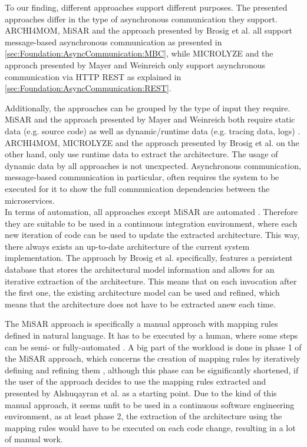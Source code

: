 To our finding, different approaches support different purposes.
The presented approaches differ in the type of asynchronous communication they support.
ARCHI4MOM, MiSAR and the approach presented by Brosig et al. all support message-based asynchronous communication as presented in \autoref{sec:Foundation:AsyncCommunication:MBC}, while MICROLYZE and the approach presented by Mayer and Weinreich only support asynchronous communication via HTTP REST as explained in \autoref{sec:Foundation:AsyncCommunication:REST}.

Additionally, the approaches can be grouped by the type of input they require.
MiSAR and the approach presented by Mayer and Weinreich both require static data (e.g. source code) as well as dynamic/runtime data (e.g. tracing data, logs) \cite{Alshuqayran2018MiSAR,Mayer2018}.
ARCHI4MOM, MICROLYZE and the approach presented by Brosig et al. on the other hand, only use runtime data to extract the architecture.
The usage of dynamic data by all approaches is not unexpected.
Asynchronous communication, message-based communication in particular, often requires the system to be executed for it to show the full communication dependencies between the microservices.
\\

In terms of automation, all approaches except MiSAR are automated \cite{Alshuqayran2018MiSAR,Singh2022ARCHI4MOM,Brosig2011,Mayer2018,Kleehaus2018}.
Therefore they are suitable to be used in a continuous integration environment, where each new iteration of code can be used to update the extracted architecture.
This way, there always exists an up-to-date architecture of the current system implementation.
The approach by Brosig et al. specifically, features a persistent database that stores the architectural model information \cite{Brosig2011} and allows for an iterative extraction of the architecture.
This means that on each invocation after the first one, the existing architecture model can be used and refined, which means that the architecture does not have to be extracted anew each time.

The MiSAR approach is specifically a manual approach with mapping rules defined in natural language.
It has to be executed by a human, where some steps can be semi- or fully-automated \cite{Alshuqayran2020Thesis}.
A big part of the workload is done in phase 1 of the MiSAR approach, which concerns the creation of mapping rules by iteratively defining and refining them \cite{Alshuqayran2018MiSAR}, although this phase can be significantly shortened, if the user of the approach decides to use the mapping rules extracted and presented by Alshuqayran et al. as a starting point.
Due to the kind of this manual approach, it seems unfit to be used in a continuous software engineering environment, as at least phase 2, the extraction of the architecture using the mapping rules would have to be executed on each code change, resulting in a lot of manual work.
\\


